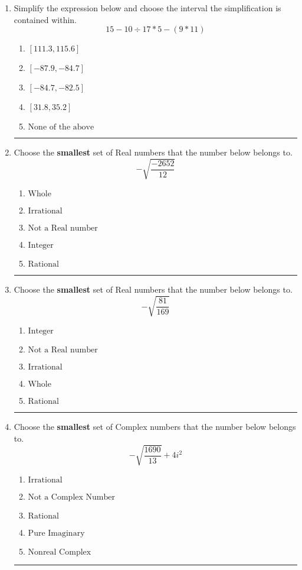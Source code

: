 \documentclass[14pt]{extbook}
\newcommand{\litem}[1]{\item#1\hspace*{-1cm}\rule{\textwidth}{0.4pt}}
\begin{document}
\begin{enumerate}
{\begin{enumerate}[label=\Alph*.]
\end{enumerate} }
\litem{
Simplify the expression below and choose the interval the simplification is contained within.\[ 15 - 10 \div 17 * 5 - (9 * 11) \]\begin{enumerate}[label=\Alph*.]
\item \( [111.3, 115.6] \)
\item \( [-87.9, -84.7] \)
\item \( [-84.7, -82.5] \)
\item \( [31.8, 35.2] \)
\item \( \text{None of the above} \)

\end{enumerate} }
\litem{
Choose the \textbf{smallest} set of Real numbers that the number below belongs to.\[ -\sqrt{\frac{-2652}{12}} \]\begin{enumerate}[label=\Alph*.]
\item \( \text{Whole} \)
\item \( \text{Irrational} \)
\item \( \text{Not a Real number} \)
\item \( \text{Integer} \)
\item \( \text{Rational} \)

\end{enumerate} }
\litem{
Choose the \textbf{smallest} set of Real numbers that the number below belongs to.\[ -\sqrt{\frac{81}{169}} \]\begin{enumerate}[label=\Alph*.]
\item \( \text{Integer} \)
\item \( \text{Not a Real number} \)
\item \( \text{Irrational} \)
\item \( \text{Whole} \)
\item \( \text{Rational} \)

\end{enumerate} }
\litem{
Choose the \textbf{smallest} set of Complex numbers that the number below belongs to.\[ -\sqrt{\frac{1690}{13}}+4i^2 \]\begin{enumerate}[label=\Alph*.]
\item \( \text{Irrational} \)
\item \( \text{Not a Complex Number} \)
\item \( \text{Rational} \)
\item \( \text{Pure Imaginary} \)
\item \( \text{Nonreal Complex} \)


\end{enumerate}}
\end{enumerate}
\end{document}
